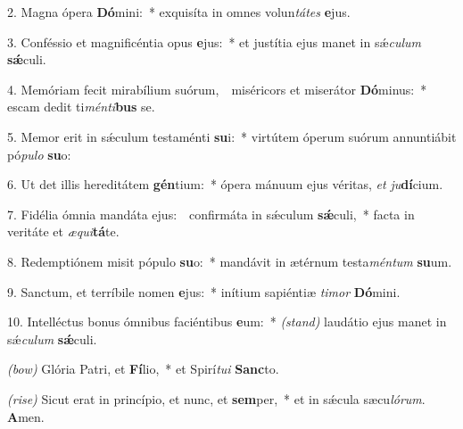 2. Magna ópera \textbf{Dó}mini:~*
	exquisíta in omnes volun\textit{tá}\textit{tes} \textbf{e}jus.

3. Conféssio et magnificéntia opus \textbf{e}jus:~*
	et justítia ejus manet in s\'{\ae}\textit{cu}\-\textit{lum} \textbf{s\'{\ae}}culi.

4. Memóriam fecit mirabílium suórum,~\GreDagger\
	miséricors et miserátor \textbf{Dó}\-minus:~*
	escam dedit ti\textit{mén}\textit{ti}\textbf{bus} se.

5. Memor erit in s\'{\ae}culum testaménti \textbf{su}i:~*
	virtútem óperum suórum annuntiábit pó\textit{pu}\textit{lo} \textbf{su}o:

6. Ut det illis hereditátem \textbf{gén}ti\-um:~*
	ópera mánuum ejus véritas, \textit{et} \textit{ju}\textbf{dí}\-cium.

7. Fidélia ómnia mandáta ejus:~\GreDagger\
	confirmáta in s\'{\ae}culum \textbf{s\'{\ae}}culi,~*
	facta in veritáte et \textit{æ}\textit{qui}\textbf{tá}te.

8. Redemptiónem misit pópulo \textbf{su}o:~*
	mandávit in ætérnum testa\textit{mén}\textit{tum} \textbf{su}um.

9. Sanctum, et terríbile nomen \textbf{e}jus:~*
	inítium sapiéntiæ \textit{ti}\textit{mor} \textbf{Dó}\-mini.

10. Intelléctus bonus ómnibus faciéntibus \textbf{e}um:~* {\color{red}\textit{(stand)}}
	laudátio ejus manet in s\'{\ae}\textit{cu}\textit{lum} \textbf{s\'{\ae}}culi.

{\color{red}\textit{(bow)}} Glória Patri, et \textbf{Fí}lio,~*
	et Spirí\textit{tu}\textit{i} \textbf{Sanc}to.

{\color{red}\textit{(rise)}} Sicut erat in princípio, et nunc, et \textbf{sem}per,~*
	et in s\'{\ae}cula sæcu\textit{ló}\textit{rum}. \textbf{A}men.